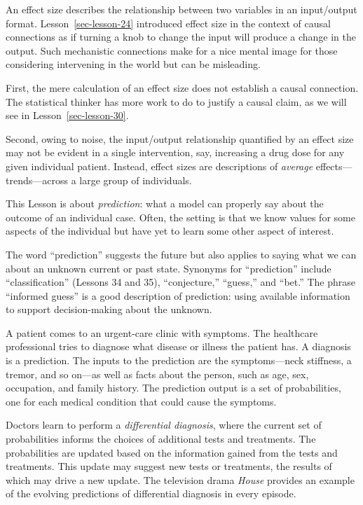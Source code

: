 \documentclass[
  letterpaper,
  DIV=11,
  numbers=noendperiod,
  oneside]{scrreprt}
\begin{document}
An effect size describes the relationship between two variables in an
input/output format. Lesson~\ref{sec-lesson-24} introduced effect size
in the context of causal connections as if turning a knob to change the
input will produce a change in the output. Such mechanistic connections
make for a nice mental image for those considering intervening in the
world but can be misleading.

First, the mere calculation of an effect size does not establish a
causal connection. The statistical thinker has more work to do to
justify a causal claim, as we will see in Lesson~\ref{sec-lesson-30}.

Second, owing to noise, the input/output relationship quantified by an
effect size may not be evident in a single intervention, say, increasing
a drug dose for any given individual patient. Instead, effect sizes are
descriptions of \emph{average} effects---trends---across a large group
of individuals.

This Lesson is about \emph{prediction}: what a model can properly say
about the outcome of an individual case. Often, the setting is that we
know values for some aspects of the individual but have yet to learn
some other aspect of interest.

The word ``prediction'' suggests the future but also applies to saying
what we can about an unknown current or past state. Synonyms for
``prediction'' include ``classification'' (Lessons 34 and 35),
``conjecture,'' ``guess,'' and ``bet.'' The phrase ``informed guess'' is
a good description of prediction: using available information to support
decision-making about the unknown.

\begin{tcolorbox}[enhanced jigsaw, colbacktitle=quarto-callout-note-color!10!white, breakable, opacitybacktitle=0.6, colback=white, left=2mm, arc=.35mm, colframe=quarto-callout-note-color-frame, coltitle=black, toprule=.15mm, opacityback=0, leftrule=.75mm, bottomtitle=1mm, toptitle=1mm, titlerule=0mm, title=\textcolor{quarto-callout-note-color}{\faInfo}\hspace{0.5em}{Example: Differential diagnosis}, rightrule=.15mm, bottomrule=.15mm]

A patient comes to an urgent-care clinic with symptoms. The healthcare
professional tries to diagnose what disease or illness the patient has.
A diagnosis is a prediction. The inputs to the prediction are the
symptoms---neck stiffness, a tremor, and so on---as well as facts about
the person, such as age, sex, occupation, and family history. The
prediction output is a set of probabilities, one for each medical
condition that could cause the symptoms.

Doctors learn to perform a \emph{differential diagnosis}, where the
current set of probabilities informs the choices of additional tests and
treatments. The probabilities are updated based on the information
gained from the tests and treatments. This update may suggest new tests
or treatments, the results of which may drive a new update. The
television drama \emph{House} provides an example of the evolving
predictions of differential diagnosis in every episode.

\end{tcolorbox}
\end{document}
